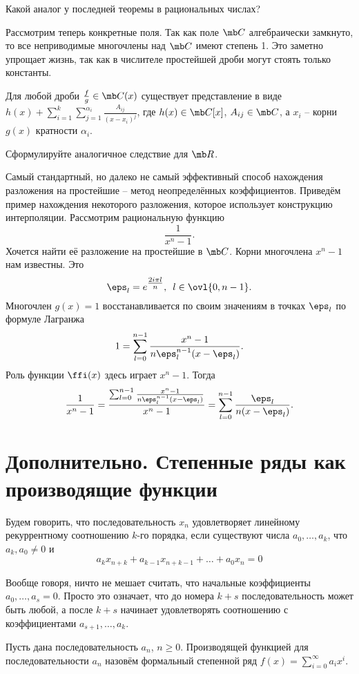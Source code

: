 \zd Какой аналог у последней теоремы в рациональных числах?
\ezd

Рассмотрим теперь конкретные поля. Так как поле $\mb C$ алгебраически замкнуто, то все неприводимые многочлены над $\mb C$ имеют степень 1. Это заметно упрощает жизнь, так как в числителе простейшей дроби могут стоять только константы.

\crl Для любой дроби $\frac{f}{g}\in \mb C(x)$ существует представление в виде $h(x)+\sum_{i=1}^k\sum_{j=1}^{\alpha_i}\frac{A_{ij}}{(x-x_i)^j}$, где $h(x)\in \mb C[x]$, $A_{ij}\in \mb C$, а $x_i$ -- корни $g(x)$ кратности $\alpha_i$.
\ecrl 

\upr Сформулируйте аналогичное следствие для $\mb R$.
\eupr

Самый стандартный, но далеко не самый эффективный способ нахождения разложения на простейшие -- метод неопределённых коэффициентов. Приведём пример нахождения некоторого разложения, которое использует конструкцию интерполяции. Рассмотрим рациональную функцию $$\frac{1}{x^n-1}.$$
Хочется найти её разложение на простейшие в $\mb C$. Корни  многочлена $x^n-1$ нам известны. Это $$\eps_l=e^{\tfrac{2i \pi l}{n}},\,\,\,l\in \ovl{0,n-1}.$$ Многочлен $g(x)=1$ восстанавливается по своим значениям в точках  $\eps_l$ по формуле Лагранжа
$$1=\sum_{l=0}^{n-1} \frac{ x^n-1}{n\eps_l^{n-1}(x-\eps_l)}.$$
Роль функции $\ffi(x)$ здесь играет $x^n-1$. Тогда
$$\frac{1}{x^n-1}=\frac{\sum_{l=0}^{n-1} \frac{ x^n-1}{n\eps_l^{n-1}(x-\eps_l)}}{x^n-1}= \sum_{l=0}^{n-1} \frac{\eps_l}{n(x-\eps_l)}.$$



\section{Дополнительно. Степенные ряды как производящие функции}


 Будем говорить, что последовательность $x_n$ удовлетворяет линейному рекуррентному соотношению $k$-го порядка, если существуют числа $a_0,\dots,a_{k}$, что $a_k,a_0\neq 0$ и
$$a_k x_{n+k}+a_{k-1}x_{n+k-1}+\dots+a_0x_n=0$$
\edfn


\rm Вообще говоря, ничто не мешает считать, что начальные коэффициенты $a_0,\dots,a_s=0$. Просто это означает, что до номера $k+s$ последовательность может быть любой, а после $k+s$ начинает удовлетворять соотношению с коэффициентами $a_{s+1},\dots,a_k$.
\erm

 Пусть дана последовательность $a_n$, $n\geq 0$. Производящей функцией для последовательности $a_n$ назовём формальный степенной ряд $f(x)=\sum_{i=0}^{\infty} a_ix^i$.
\edfn



